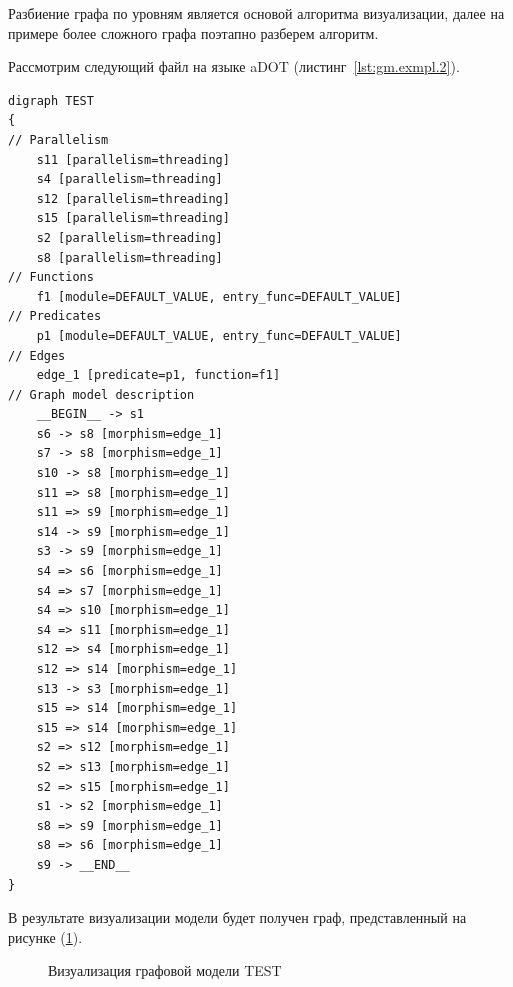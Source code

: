 Разбиение графа по уровням является основой алгоритма визуализации, далее на примере более сложного графа поэтапно разберем алгоритм.

Рассмотрим следующий файл на языке \textsf{aDOT} (листинг~\ref{lst:gm.exmpl.2}).

\begin{lstlisting}[frame=single, label={lst:gm.exmpl.2}, caption={Пример aDOT-определения графовой модели \textsf{TEST}}, language=aDOTExample]
digraph TEST
{
// Parallelism
	s11 [parallelism=threading]
	s4 [parallelism=threading]
	s12 [parallelism=threading]
	s15 [parallelism=threading]
	s2 [parallelism=threading]
	s8 [parallelism=threading]
// Functions
	f1 [module=DEFAULT_VALUE, entry_func=DEFAULT_VALUE]
// Predicates
	p1 [module=DEFAULT_VALUE, entry_func=DEFAULT_VALUE]
// Edges
	edge_1 [predicate=p1, function=f1]
// Graph model description
	__BEGIN__ -> s1
	s6 -> s8 [morphism=edge_1]
	s7 -> s8 [morphism=edge_1]
	s10 -> s8 [morphism=edge_1]
	s11 => s8 [morphism=edge_1]
	s11 => s9 [morphism=edge_1]
	s14 -> s9 [morphism=edge_1]
	s3 -> s9 [morphism=edge_1]
	s4 => s6 [morphism=edge_1]
	s4 => s7 [morphism=edge_1]
	s4 => s10 [morphism=edge_1]
	s4 => s11 [morphism=edge_1]
	s12 => s4 [morphism=edge_1]
	s12 => s14 [morphism=edge_1]
	s13 -> s3 [morphism=edge_1]
	s15 => s14 [morphism=edge_1]
	s15 => s14 [morphism=edge_1]
	s2 => s12 [morphism=edge_1]
	s2 => s13 [morphism=edge_1]
	s2 => s15 [morphism=edge_1]
	s1 -> s2 [morphism=edge_1]
	s8 => s9 [morphism=edge_1]
	s8 => s6 [morphism=edge_1]
	s9 -> __END__ 
}
\end{lstlisting}

В результате визуализации модели будет получен граф, представленный на рисунке (\ref{fig:main_graph}).

\begin{figure}[ht!]
\caption{Визуализация графовой модели \textsf{TEST}}\label{fig:main_graph}
\end{figure}

